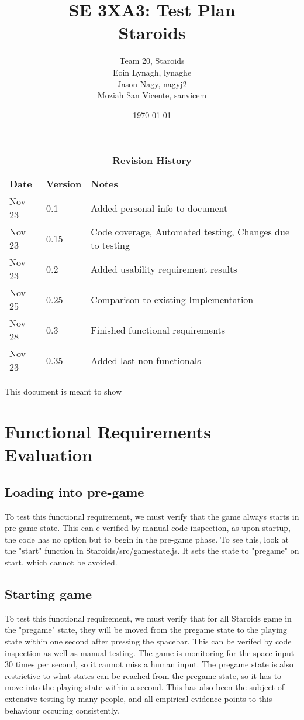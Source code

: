 \documentclass[12pt, titlepage]{article}
\title{SE 3XA3: Test Plan\\Staroids}
\author{Team 20, Staroids
		\\ Eoin Lynagh, lynaghe
		\\ Jason Nagy, nagyj2
		\\ Moziah San Vicente, sanvicem
}
\date{\today}
\begin{document}
\maketitle

\tableofcontents
\listoftables
\listoffigures

\begin{table}[bp]
\caption{\bf Revision History}
\begin{tabularx}{\textwidth}{p{3cm}p{2cm}X}
\toprule {\bf Date} & {\bf Version} & {\bf Notes}\\
\midrule
Nov 23 & 0.1 & Added personal info to document\\
Nov 23 & 0.15 & Code coverage, Automated testing, Changes due to testing\\
Nov 23 & 0.2 & Added usability requirement results\\
Nov 25 & 0.25 & Comparison to existing Implementation\\
Nov 28 & 0.3 & Finished functional requirements\\
Nov 23 & 0.35 & Added last non functionals\\
\bottomrule
\end{tabularx}
\end{table}

\newpage


This document is meant to show \\

\section{Functional Requirements Evaluation}
\subsection{Loading into pre-game}
To test this functional requirement, we must verify that the game always starts in pre-game state. This can e verified by manual code inspection, as upon startup, the code has no option but to begin in the pre-game phase. To see this, look at the "start" function in Staroids/src/gamestate.js. It sets the state to "pregame" on start, which cannot be avoided.
\subsection{Starting game}
To test this functional requirement, we must verify that for all Staroids game in the "pregame" state, they will be moved from the pregame state to the playing state within one second after pressing the spacebar. This can be verifed by code inspection as well as manual testing. The game is monitoring for the space input 30 times per second, so it cannot miss a human input. The pregame state is also restrictive to what states can be reached from the pregame state, so it has to move into the playing state within a second. This has also been the subject of extensive testing by many people, and all empirical evidence points to this behaviour occuring consistently.
\end{document}
